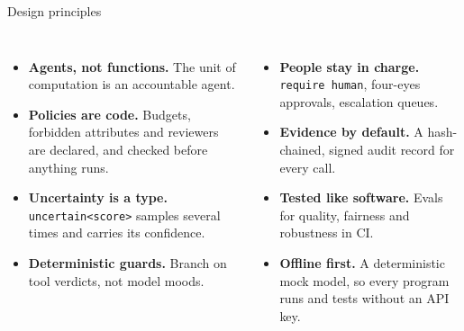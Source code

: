\documentclass[aspectratio=169,10pt]{beamer}
\begin{document}
\begin{frame}{Design principles}
\begin{columns}[T]
\begin{itemize}\setlength\itemsep{5pt}
\item \textbf{Agents, not functions.} The unit of computation is an accountable agent.
\item \textbf{Policies are code.} Budgets, forbidden attributes and reviewers are declared, and checked before anything runs.
\item \textbf{Uncertainty is a type.} \texttt{uncertain<score>} samples several times and carries its confidence.
\item \textbf{Deterministic guards.} Branch on tool verdicts, not model moods.
\end{itemize}
\begin{itemize}\setlength\itemsep{5pt}
\item \textbf{People stay in charge.} \texttt{require human}, four-eyes approvals, escalation queues.
\item \textbf{Evidence by default.} A hash-chained, signed audit record for every call.
\item \textbf{Tested like software.} Evals for quality, fairness and robustness in CI.
\item \textbf{Offline first.} A deterministic mock model, so every program runs and tests without an API key.
\end{itemize}
\end{columns}
\end{frame}
\end{document}
